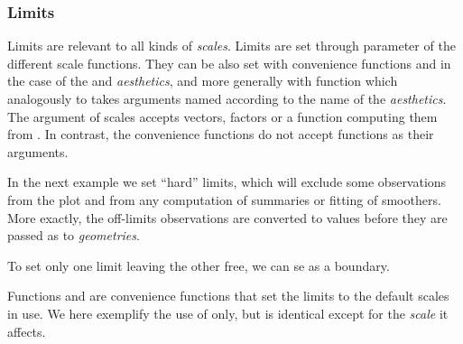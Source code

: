 \documentclass[krantz2]{krantz}\usepackage{knitr}%
\begin{document}
\subsubsection{Limits}

Limits are relevant to all kinds of \emph{scales}. Limits are set through parameter  of the different scale functions. They can be also set with convenience functions  and  in the case of the  and  \emph{aesthetics}, and more generally with function  which analogously to  takes arguments named according to the name of the \emph{aesthetics}. The  argument of scales accepts vectors, factors or a function computing them from . In contrast, the convenience functions do not accept functions as their arguments.

In the next example we set ``hard'' limits, which will exclude some observations from the plot and from any computation of summaries or fitting of smoothers. More exactly, the off-limits observations are converted to  values before they are passed as  to \emph{geometries}.

\begin{knitrout}\footnotesize
{}\color{fgcolor}\begin{kframe}
\begin{alltt}
  \hlopt{+} \hlstd{()} \hlopt{+}
  \hlstd{(} \hlstd{=} \hlstd{(}\hlstd{,} \hlstd{))}
\end{alltt}
\end{kframe}
\end{knitrout}

To set only one limit leaving the other free, we can se  as a boundary.

\begin{knitrout}\footnotesize
{}\color{fgcolor}\begin{kframe}
\begin{alltt}
  \hlstd{(} \hlstd{=} \hlstd{(}\hlstd{,} \hlstd{))}
\end{alltt}
\end{kframe}
\end{knitrout}

Functions  and  are convenience functions that set the limits to the default scales in use. We here exemplify the use of  only, but  is identical except for the \emph{scale} it affects.
\end{document}
